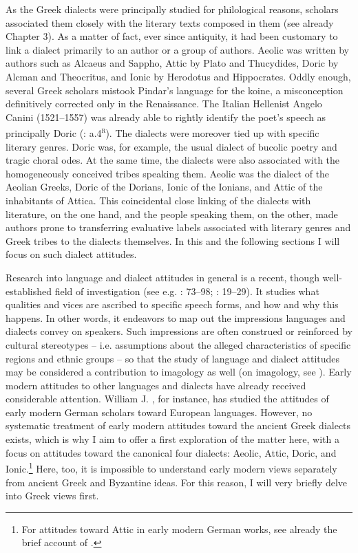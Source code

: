 As the Greek dialects were principally studied for philological reasons, scholars associated them closely with the literary texts composed in them (see already Chapter 3). As a matter of fact, ever since antiquity, it had been customary to link a dialect primarily to an author or a group of authors. Aeolic was written by authors such as Alcaeus and Sappho, Attic by Plato and Thucydides, Doric by Alcman and Theocritus, and Ionic by Herodotus and Hippocrates. Oddly enough, several Greek scholars mistook Pindar’s language for the koine, a misconception definitively corrected only in the Renaissance. The Italian Hellenist Angelo Canini (1521–1557) was already able to rightly identify the poet’s speech as principally Doric (\citealt{Canini1555}: a.4\textsc{\textsuperscript{r}}). The dialects were moreover tied up with specific literary genres. Doric was, for example, the usual dialect of bucolic poetry and tragic choral odes. At the same time, the dialects were also associated with the homogeneously conceived tribes speaking them. Aeolic was the dialect of the Aeolian Greeks, Doric of the Dorians, Ionic of the Ionians, and Attic of the inhabitants of Attica. This coincidental close linking of the dialects with literature, on the one hand, and the people speaking them, on the other, made authors prone to transferring evaluative labels associated with literary genres and Greek tribes to the dialects themselves. In this and the following sections I will focus on such dialect attitudes.

Research into language and dialect attitudes in general is a recent, though well-established field of investigation (see e.g. \citealt{Edwards2009}: 73–98; \citealt{Garrett2010}: 19–29). It studies what qualities and vices are ascribed to specific speech forms, and how and why this happens. In other words, it endeavors to map out the impressions languages and dialects convey on speakers. Such impressions are often construed or reinforced by cultural stereotypes – i.e. assumptions about the alleged characteristics of specific regions and ethnic groups – so that the study of language and dialect attitudes may be considered a contribution to imagology as well (on imagology, see \citealt{BellerLeerssen2007}). Early modern attitudes to other languages and dialects have already received considerable attention. William J. \citet{Jones1999}, for instance, has studied the attitudes of early modern German scholars toward European languages. However, no systematic treatment of early modern attitudes toward the ancient Greek dialects exists, which is why I aim to offer a first exploration of the matter here, with a focus on attitudes toward the canonical four dialects: Aeolic, Attic, Doric, and Ionic.\footnote{For attitudes toward Attic in early modern German works, see already the brief account of \citet[251--252]{Roelcke2014}.} Here, too, it is impossible to understand early modern views separately from ancient Greek and Byzantine ideas. For this reason, I will very briefly delve into Greek views first.

